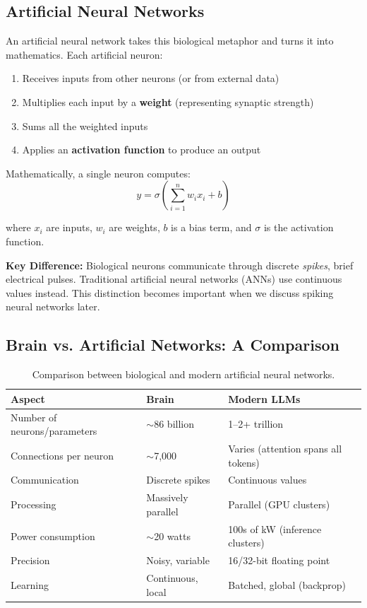 \documentclass[11pt,a4paper]{article}
\begin{document}
\subsection{Artificial Neural Networks}

An artificial neural network takes this biological metaphor and turns it into mathematics. Each artificial neuron:

\begin{enumerate}
    \item Receives inputs from other neurons (or from external data)
    \item Multiplies each input by a \textbf{weight} (representing synaptic strength)
    \item Sums all the weighted inputs
    \item Applies an \textbf{activation function} to produce an output
\end{enumerate}

Mathematically, a single neuron computes:
\begin{equation}
    y = \sigma\left(\sum_{i=1}^{n} w_i x_i + b\right)
\end{equation}

where $x_i$ are inputs, $w_i$ are weights, $b$ is a bias term, and $\sigma$ is the activation function.

\begin{tcolorbox}[keypoint]
\textbf{Key Difference:} Biological neurons communicate through discrete \textit{spikes}, brief electrical pulses. Traditional artificial neural networks (ANNs) use continuous values instead. This distinction becomes important when we discuss spiking neural networks later.
\end{tcolorbox}

\subsection{Brain vs. Artificial Networks: A Comparison}

\begin{table}[H]
\centering
\begin{tabular}{lll}
\toprule
\textbf{Aspect} & \textbf{Brain} & \textbf{Modern LLMs} \\
\midrule
Number of neurons/parameters & $\sim$86 billion & 1--2+ trillion \\
Connections per neuron & $\sim$7,000 & Varies (attention spans all tokens) \\
Communication & Discrete spikes & Continuous values \\
Processing & Massively parallel & Parallel (GPU clusters) \\
Power consumption & $\sim$20 watts & 100s of kW (inference clusters) \\
Precision & Noisy, variable & 16/32-bit floating point \\
Learning & Continuous, local & Batched, global (backprop) \\
\bottomrule
\end{tabular}
\caption{Comparison between biological and modern artificial neural networks.}
\end{table}
\end{document}
